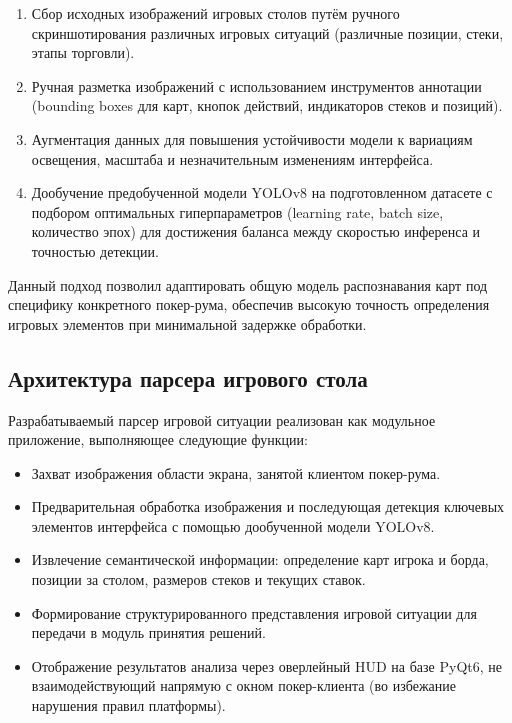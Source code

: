 \begin{enumerate}
    \item Сбор исходных изображений игровых столов путём ручного скриншотирования различных игровых ситуаций (различные позиции, стеки, этапы торговли).
    
    \item Ручная разметка изображений с использованием инструментов аннотации (bounding boxes для карт, кнопок действий, индикаторов стеков и позиций).
    
    \item Аугментация данных для повышения устойчивости модели к вариациям освещения, масштаба и незначительным изменениям интерфейса.
    
    \item Дообучение предобученной модели YOLOv8 на подготовленном датасете с подбором оптимальных гиперпараметров (learning rate, batch size, количество эпох) для достижения баланса между скоростью инференса и точностью детекции.
\end{enumerate}

Данный подход позволил адаптировать общую модель распознавания карт под специфику конкретного покер-рума, обеспечив высокую точность определения игровых элементов при минимальной задержке обработки.

\subsection{Архитектура парсера игрового стола}
Разрабатываемый парсер игровой ситуации реализован как модульное приложение, выполняющее следующие функции:

\begin{itemize}
    \item Захват изображения области экрана, занятой клиентом покер-рума.
    
    \item Предварительная обработка изображения и последующая детекция ключевых элементов интерфейса с помощью дообученной модели YOLOv8.
    
    \item Извлечение семантической информации: определение карт игрока и борда, позиции за столом, размеров стеков и текущих ставок.
    
    \item Формирование структурированного представления игровой ситуации для передачи в модуль принятия решений.
    
    \item Отображение результатов анализа через оверлейный HUD на базе PyQt6, не взаимодействующий напрямую с окном покер-клиента (во избежание нарушения правил платформы).
\end{itemize}
